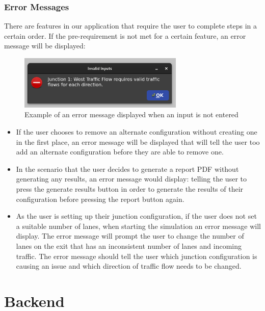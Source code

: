 \documentclass{article}
\begin{document}
    \subsubsection{Error Messages}
    There are features in our application that require the user to complete steps in a certain order.
    If the pre-requirement is not met for a certain feature, an error message will be displayed:

    \begin{figure}[H]
        \centering
        \includegraphics[width=0.7\textwidth]{example_error}
        \caption{Example of an error message displayed when an input is not entered}
        \label{fig:sampleError}
    \end{figure}

    \begin{itemize}
        \item If the user chooses to remove an alternate configuration without creating one in the first place, an error message will be displayed that will tell the user too add an alternate configuration before they are able to remove one.
        \item In the scenario that the user decides to generate a report PDF without generating any results, an error message would display: telling the user to press the generate results button in order to generate the results of their configuration before pressing the report button again.
        \item As the user is setting up their junction configuration, if the user does not set a suitable number of lanes, when starting the simulation an error message will display. The error message will prompt the user to change the number of lanes on the exit that has an inconsistent number of lanes and incoming traffic. The error message should tell the user which junction configuration is causing an issue and which direction of traffic flow needs to be changed.
    \end{itemize}


    \section{Backend}
\end{document}
